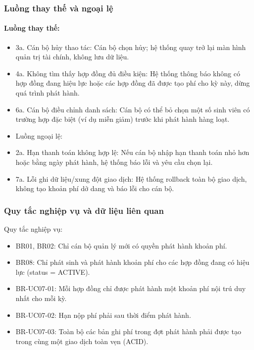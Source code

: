 \subsubsection{Luồng thay thế và ngoại lệ}

\paragraph{Luồng thay thế:}

\begin{itemize}[leftmargin=1.4em]
\item 3a. Cán bộ hủy thao tác: Cán bộ chọn hủy; hệ thống quay trở lại màn hình quản trị tài chính, không lưu dữ liệu.
\item 4a. Không tìm thấy hợp đồng đủ điều kiện: Hệ thống thông báo không có hợp đồng đang hiệu lực hoặc các hợp đồng đã được tạo phí cho kỳ này, dừng quá trình phát hành.
\item 6a. Cán bộ điều chỉnh danh sách: Cán bộ có thể bỏ chọn một số sinh viên có trường hợp đặc biệt (ví dụ miễn giảm) trước khi phát hành hàng loạt.
\item Luồng ngoại lệ:
\item 2a. Hạn thanh toán không hợp lệ: Nếu cán bộ nhập hạn thanh toán nhỏ hơn hoặc bằng ngày phát hành, hệ thống báo lỗi và yêu cầu chọn lại.
\item 7a. Lỗi ghi dữ liệu/xung đột giao dịch: Hệ thống rollback toàn bộ giao dịch, không tạo khoản phí dở dang và báo lỗi cho cán bộ.
\end{itemize}

\subsubsection{Quy tắc nghiệp vụ và dữ liệu liên quan}

Quy tắc nghiệp vụ:

\begin{itemize}[leftmargin=1.4em]
\item BR01, BR02: Chỉ cán bộ quản lý mới có quyền phát hành khoản phí.
\item BR08: Chỉ phát sinh và phát hành khoản phí cho các hợp đồng đang có hiệu lực (status = ACTIVE).
\item BR-UC07-01: Mỗi hợp đồng chỉ được phát hành một khoản phí nội trú duy nhất cho mỗi kỳ.
\item BR-UC07-02: Hạn nộp phí phải sau thời điểm phát hành.
\item BR-UC07-03: Toàn bộ các bản ghi phí trong đợt phát hành phải được tạo trong cùng một giao dịch toàn vẹn (ACID).
\end{itemize}

